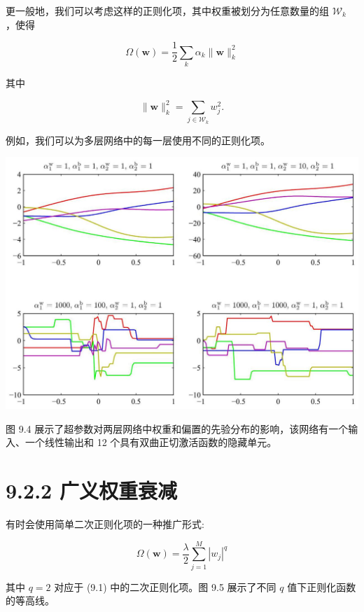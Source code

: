 \documentclass[10pt]{article}
\begin{document}
更一般地，我们可以考虑这样的正则化项，其中权重被划分为任意数量的组 \({\mathcal{W}}_{k}\) ，使得

\[
\Omega \left( \mathbf{w}\right)  = \frac{1}{2}\mathop{\sum }\limits_{k}{\alpha }_{k}\parallel \mathbf{w}{\parallel }_{k}^{2} \tag{9.16}
\]

其中

\[
\parallel \mathbf{w}{\parallel }_{k}^{2} = \mathop{\sum }\limits_{{j \in  {\mathcal{W}}_{k}}}{w}_{j}^{2}. \tag{9.17}
\]

例如，我们可以为多层网络中的每一层使用不同的正则化项。

\begin{center}
\includegraphics[max width=1.0\textwidth]{images/0194e279-9b28-703a-88f4-c3ac21e2010d_283_264_396_1267_905_0.jpg}
\end{center}
\hspace*{3em} 

图 9.4 展示了超参数对两层网络中权重和偏置的先验分布的影响，该网络有一个输入、一个线性输出和 12 个具有双曲正切激活函数的隐藏单元。

\section*{9.2.2 广义权重衰减}

有时会使用简单二次正则化项的一种推广形式:

\[
\Omega \left( \mathbf{w}\right)  = \frac{\lambda }{2}\mathop{\sum }\limits_{{j = 1}}^{M}{\left| {w}_{j}\right| }^{q} \tag{9.18}
\]

其中 \(q = 2\) 对应于 (9.1) 中的二次正则化项。图 9.5 展示了不同 \(q\) 值下正则化函数的等高线。
\end{document}
